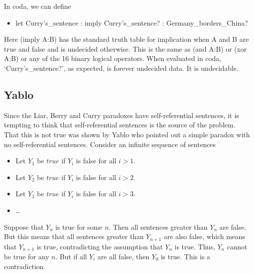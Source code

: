 \documentclass[11pt]{article}
\begin{document}
In coda, we can define
\begin{itemize}
\item let Curry's\_sentence : imply Curry's\_sentence? : Germany\_borders\_China?
\end{itemize}
Here (imply A:B) has the standard truth table for implication when A and B are true and false and
is undecided otherwise.  This is the same as (and A:B) or (xor A:B) or any of the 16 binary logical operators.
When evaluated in coda, `Curry's\_sentence?', as expected, is forever undecided data.  It is undecidable.

\subsection{Yablo}

     Since the Liar, Berry and Curry paradoxes have self-referential sentences, it is tempting to think 
that self-referential sentences is the source of the problem.  That this is not true was shown by Yablo\cite{Yablo} who 
pointed out a simple paradox with no self-referential sentences.  Consider an infinite sequence 
of sentences 
\begin{itemize}
\item Let $Y_1$ be $true$ if $Y_i$ is false for all $i>1$.
\item Let $Y_2$ be $true$ if $Y_i$ is false for all $i>2$.
\item Let $Y_3$ be $true$ if $Y_i$ is false for all $i>3$.
\item \dots
\end{itemize}
Suppose that $Y_n$ is true for some $n$.  Then all sentences greater than $Y_n$ are false.  But this means 
that all sentences greater than $Y_{n+1}$ are also false, which means that $Y_{n+1}$ is true, contradicting 
the assumption that $Y_n$ is true.  Thus, $Y_n$ cannot be true for any $n$.  But if all $Y_i$ are all false, then  
$Y_0$ is true.  This is a contradiction.  
\end{document}
